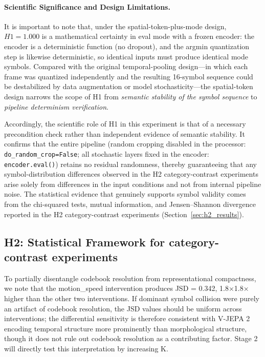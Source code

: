\documentclass{article}
\begin{document}
\paragraph{Scientific Significance and Design Limitations.}
It is important to note that, under the spatial-token-plus-mode design, $H1 =
1.000$ is a mathematical certainty in eval mode with a frozen encoder: the
encoder is a deterministic function (no dropout), and the argmin quantization
step is likewise deterministic, so identical inputs must produce identical mode
symbols.  Compared with the original temporal-pooling design---in which each
frame was quantized independently and the resulting 16-symbol sequence could be
destabilized by data augmentation or model stochasticity---the spatial-token
design narrows the scope of H1 from \emph{semantic stability of the symbol
sequence} to \emph{pipeline determinism verification}.

Accordingly, the scientific role of H1 in this experiment is that of a
necessary precondition check rather than independent evidence of semantic
stability.  It confirms that the entire pipeline (random cropping disabled in
the processor: \texttt{do\_random\_crop=False}; all stochastic layers fixed in
the encoder: \texttt{encoder.eval()}) retains no residual randomness, thereby
guaranteeing that any symbol-distribution differences observed in the H2
category-contrast experiments arise solely from differences in the input conditions
and not from internal pipeline noise.  The statistical evidence that genuinely
supports symbol validity comes from the chi-squared tests, mutual information,
and Jensen--Shannon divergence reported in the H2 category-contrast experiments
(Section~\ref{sec:h2_results}).

\subsection{H2: Statistical Framework for category-contrast experiments}
To partially disentangle codebook resolution from representational compactness, we note that the motion\_speed intervention produces JSD = 0.342, 1.8×1.8× higher than the other two interventions. If dominant symbol collision were purely an artifact of codebook resolution, the JSD values should be uniform across interventions; the differential sensitivity is therefore consistent with V-JEPA 2 encoding temporal structure more prominently than morphological structure, though it does not rule out codebook resolution as a contributing factor. Stage 2 will directly test this interpretation by increasing K.
\end{document}
